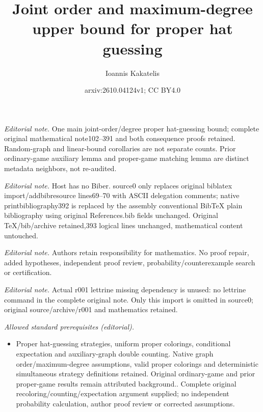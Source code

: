 \documentclass[11pt, letterpaper]{article}
\title{Joint order and maximum-degree upper bound for proper hat guessing}
\author{Ioannis Kakatelis}
\date{arxiv:2610.04124v1; CC BY4.0}
\theoremstyle{plain}
\theoremstyle{plain}
\begin{document}
\maketitle
\noindent\textit{Editorial note.} One main joint-order/degree proper hat-guessing bound; complete original mathematical note102--391 and both consequence proofs retained. Random-graph and linear-bound corollaries are not separate counts. Prior ordinary-game auxiliary lemma and proper-game matching lemma are distinct metadata neighbors, not re-audited.\par\medskip
\noindent\textit{Editorial note.} Host has no Biber. source0 only replaces original biblatex import/addbibresource lines69--70 with ASCII delegation comments; native printbibliography392 is replaced by the assembly conventional BibTeX plain bibliography using original References.bib fields unchanged. Original TeX/bib/archive retained,393 logical lines unchanged, mathematical content untouched.\par\medskip
\noindent\textit{Editorial note.} Authors retain responsibility for mathematics. No proof repair, added hypotheses, independent proof review, probability/counterexample search or certification.\par\medskip
\noindent\textit{Editorial note.} Actual r001 lettrine missing dependency is unused: no lettrine command in the complete original note. Only this import is omitted in source0; original source/archive/r001 and mathematics retained.\par\medskip
\noindent\textit{Allowed standard prerequisites (editorial).}\begin{itemize}
\item Proper hat-guessing strategies, uniform proper colorings, conditional expectation and auxiliary-graph double counting. Native graph order/maximum-degree assumptions, valid proper colorings and deterministic simultaneous strategy definitions retained. Original ordinary-game and prior proper-game results remain attributed background.. Complete original recoloring/counting/expectation argument supplied; no independent probability calculation, author proof review or corrected assumptions.
\end{itemize}\medskip
\end{document}
